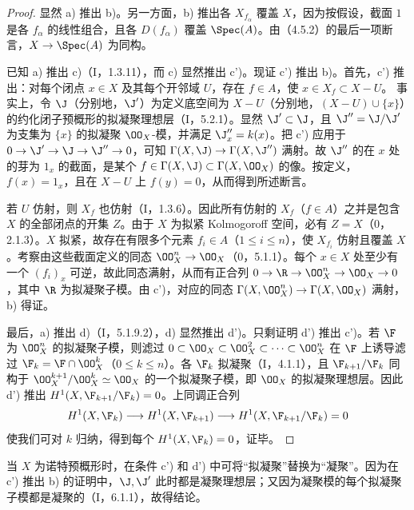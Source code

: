 \begin{proof}
显然 a) 推出 b)。另一方面，b) 推出各 $X_{f_\alpha}$ 覆盖 $X$，因为按假设，截面 $1$ 是各 $f_\alpha$ 的线性组合，且各 $D(f_\alpha)$ 覆盖 $\Spec(A)$。由（4.5.2）的最后一项断言，$X\to\Spec(A)$ 为同构。

已知 a) 推出 c)（I，1.3.11），而 c) 显然推出 c')。现证 c') 推出 b)。首先，c') 推出：对每个闭点 $x\in X$ 及其每个开邻域 $U$，存在 $f\in A$，使 $x\in X_f\subset X-U$。
事实上，令 $\J$（分别地，$\J'$）为定义底空间为 $X-U$（分别地，$(X-U)\cup\{x\}$）的约化闭子预概形的拟凝聚理想层（I，5.2.1）。显然 $\J'\subset\J$，且 $\J''=\J/\J'$ 为支集为 $\{x\}$ 的拟凝聚 $\OO_X$-模，并满足 $\J''_x=k(x)$。把 c') 应用于
$0\to\J'\to\J\to\J''\to0$，可知 $\Gamma(X,\J)\to\Gamma(X,\J'')$ 满射。故 $\J''$ 的在 $x$ 处的芽为 $1_x$ 的截面，是某个
$f\in\Gamma(X,\J)\subset\Gamma(X,\OO_X)$ 的像。按定义，$f(x)=1_x$，且在 $X-U$ 上 $f(y)=0$，从而得到所述断言。

若 $U$ 仿射，则 $X_f$ 也仿射（I，1.3.6）。因此所有仿射的 $X_f$（$f\in A$）之并是包含 $X$ 的全部闭点的开集 $Z$。由于 $X$ 为拟紧 Kolmogoroff 空间，必有 $Z=X$（0，2.1.3）。$X$ 拟紧，故存在有限多个元素 $f_i\in A$（$1\leq i\leq n$），使 $X_{f_i}$ 仿射且覆盖 $X$。考察由这些截面定义的同态 $\OO_X^n\to\OO_X$（0，5.1.1）。每个 $x\in X$ 处至少有一个 $(f_i)_x$ 可逆，故此同态满射，从而有正合列
$0\to\R\to\OO_X^n\to\OO_X\to0$，其中 $\R$ 为拟凝聚子模。由 c')，对应的同态
$\Gamma(X,\OO_X^n)\to\Gamma(X,\OO_X)$ 满射，b) 得证。

最后，a) 推出 d)（I，5.1.9.2），d) 显然推出 d')。只剩证明 d') 推出 c')。若 $\F$ 为 $\OO_X^n$ 的拟凝聚子模，则滤过
$0\subset\OO_X\subset\OO_X^2\subset\cdots\subset\OO_X^n$
在 $\F$ 上诱导滤过 $\F_k=\F\cap\OO_X^k$（$0\leq k\leq n$）。各 $\F_k$ 拟凝聚（I，4.1.1），且 $\F_{k+1}/\F_k$ 同构于
$\OO_X^{k+1}/\OO_X^k\simeq\OO_X$ 的一个拟凝聚子模，即 $\OO_X$ 的拟凝聚理想层。因此 d') 推出 $H^1(X,\F_{k+1}/\F_k)=0$。上同调正合列
\[
H^1(X,\F_k)\longrightarrow H^1(X,\F_{k+1})
\longrightarrow H^1(X,\F_{k+1}/\F_k)=0
\]
使我们可对 $k$ 归纳，得到每个 $H^1(X,\F_k)=0$，证毕。
\end{proof}

当 $X$ 为诺特预概形时，在条件 c') 和 d') 中可将“拟凝聚”替换为“凝聚”。因为在 c') 推出 b) 的证明中，$\J,\J'$ 此时都是凝聚理想层；又因为凝聚模的每个拟凝聚子模都是凝聚的（I，6.1.1），故得结论。

